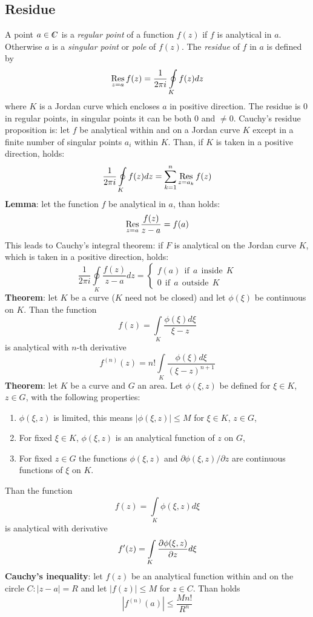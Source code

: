 \documentclass[a4paper,fancyheadings,twoside]{report}
\begin{document}
\subsection{Residue}
A point $a\in\CC$ is a {\it regular point} of a function $f(z)$ if $f$ is
analytical in $a$. Otherwise $a$ is a {\it singular point} or {\it pole} of
$f(z)$. The {\it residue} of $f$ in $a$ is defined by
\[
\mathop{\rm Res}\limits_{z=a}f(z)=\frac{1}{2\pi i}\oint\limits_Kf(z)dz
\]
where $K$ is a Jordan curve which encloses $a$ in positive direction. The
residue is 0 in regular points, in singular points it can be both 0 and $\neq0$.
Cauchy's residue proposition is: let $f$ be analytical within and on a Jordan
curve $K$ except in a finite number of singular points $a_i$ within $K$. Than,
if $K$ is taken in a positive direction, holds:
\[
\frac{1}{2\pi i}\oint\limits_Kf(z)dz=\sum_{k=1}^n\mathop{\rm Res}\limits_{z=a_k}f(z)
\]
{\bf Lemma}: let the function $f$ be analytical in $a$, than holds:
\[
\mathop{\rm Res}\limits_{z=a}\frac{f(z)}{z-a}=f(a)
\]
This leads to Cauchy's integral theorem: if $F$ is analytical on the Jordan
curve $K$, which is taken in a positive direction, holds:
\[
\frac{1}{2\pi i}\oint\limits_K\frac{f(z)}{z-a}dz=\left\{\begin{array}{l}
f(a)~~\mbox{if}~~a~~\mbox{inside}~~K\\
0~~\mbox{if}~~a~~\mbox{outside}~~K
\end{array}\right.
\]
{\bf Theorem}: let $K$ be a curve ($K$ need not be closed) and let
$\phi(\xi)$ be continuous on $K$. Than the function
\[
f(z)=\int\limits_K\frac{\phi(\xi)d\xi}{\xi-z}
\]
is analytical with $n$-th derivative
\[
f^{(n)}(z)=n!\int\limits_K\frac{\phi(\xi)d\xi}{(\xi-z)^{n+1}}
\]
{\bf Theorem}: let $K$ be a curve and $G$ an area. Let $\phi(\xi,z)$ be
defined for $\xi\in K$, $z\in G$, with the following properties:
\begin{enumerate}
\item $\phi(\xi,z)$ is limited, this means $|\phi(\xi,z)|\leq M$ for $\xi\in K$, $z\in G$,
\item For fixed $\xi\in K$, $\phi(\xi,z)$ is an analytical function of $z$ on $G$,
\item For fixed $z\in G$ the functions $\phi(\xi,z)$ and $\partial\phi(\xi,z)/\partial z$
      are continuous functions of $\xi$ on $K$.
\end{enumerate}
Than the function
\[
f(z)=\int\limits_K\phi(\xi,z)d\xi
\]
is analytical with derivative
\[
f'(z)=\int\limits_K\frac{\partial \phi(\xi,z)}{\partial z}d\xi
\]
{\bf Cauchy's inequality}: let $f(z)$ be an analytical function within and on
the circle $C:|z-a|=R$ and let $|f(z)|\leq M$ for $z\in C$. Than holds
\[
\left|f^{(n)}(a)\right|\leq\frac{Mn!}{R^n}
\]
\end{document}
